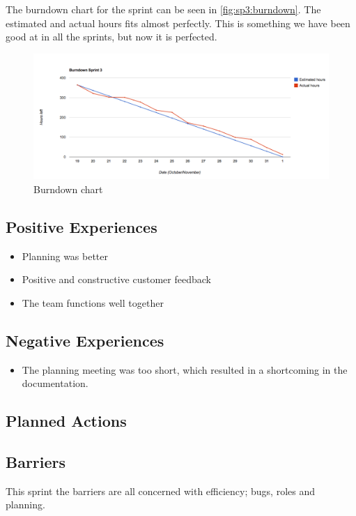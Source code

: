 The burndown chart for the sprint can be seen in \autoref{fig:sp3:burndown}. The estimated and actual hours fits almost perfectly. This is something we have been good at in all the sprints, but now it is perfected.
\begin{figure}[!htb]
	\includegraphics[width=\textwidth]{./sprints/img/burndown_chart_s3}
	\caption{Burndown chart\label{fig:sp3:burndown}}
\end{figure}


\subsection{Positive Experiences}
\begin{itemize}
	\item Planning was better
	\item Positive and constructive customer feedback
	\item The team functions well together
\end{itemize}



\subsection{Negative Experiences}
\begin{itemize}
	\item The planning meeting was too short, which resulted in a shortcoming in the documentation.
\end{itemize}


\subsection{Planned Actions}



\subsection{Barriers}
This sprint the barriers are all concerned with efficiency; bugs, roles and planning.
